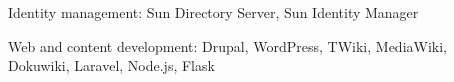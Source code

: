 \documentclass[10pt, a4paper, final]{article}
\begin{document}
\begin{section}
\begin{subsection}
\begin{compactitem}
      \item Identity management: Sun Directory Server, Sun Identity Manager
      \item Web and content development: Drupal, WordPress, TWiki, MediaWiki, Dokuwiki, Laravel, Node.js, Flask
    \end{compactitem}
  \end{subsection}
\end{section}
\vspace{1em}
\end{document}
